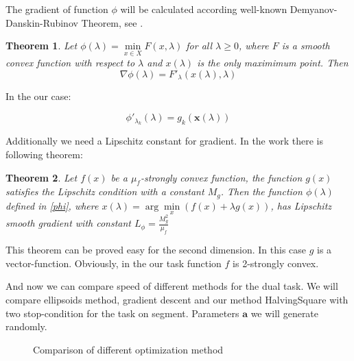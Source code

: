 \documentclass[12pt]{article}
\newtheorem{theorem}{Theorem}[section]
\begin{document}
The gradient of function $\phi$ will be calculated according well-known Demyanov-Danskin-Rubinov Theorem, see \cite{DDR-theorem1}.

\begin{theorem}
Let $\phi(\lambda)=\min\limits_{x\in X}F(x,\lambda)$ for all $\lambda\geq0$, where $F$ is a smooth convex function with respect to $\lambda$ and $x(\lambda)$ is the only maximimum point. Then
$$\nabla \phi(\lambda) = F'_\lambda\left(x(\lambda),\lambda\right)$$
\end{theorem}

In the our case:

\begin{equation}
\phi'_{\lambda_k}(\lambda) = g_k\left(\textbf{x}(\lambda)\right)
\end{equation}

Additionally we need a Lipschitz constant for gradient. In the work \cite{Stonykin} there is following theorem:
\begin{theorem}
Let $f(x)$ be a $\mu_f$-strongly convex function, the function $g(x)$ satisfies the Lipschitz condition with a constant $M_g$. Then the function $\phi(\lambda)$ defined in \ref{phi}, where $x(\lambda) = \arg\min\limits_x(f(x)+\lambda g(x))$, has Lipschitz smooth gradient with constant $L_\phi = \frac{M_g^2}{\mu_f}$
\end{theorem}

This theorem can be proved easy for the second dimension. In this case $g$ is a vector-function. Obviously, in the our task function $f$ is 2-strongly convex. 

And now we can compare speed of different methods for the dual task. We will compare ellipsoids method, gradient descent and our method HalvingSquare with two stop-condition for the task on segment. Parameters $\textbf{a}$ we will generate randomly. 

\begin{figure}[h!]
\label{fig:image}
 \caption{Comparison of different optimization method}
\end{figure}
\end{document}
